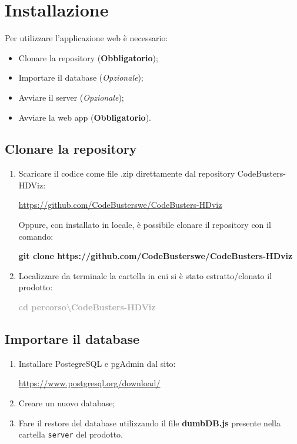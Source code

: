 \section{Installazione}
Per utilizzare l'applicazione web è necessario:
\begin{itemize}
\item Clonare la repository (\textbf{Obbligatorio});
\item Importare il database (\textit{Opzionale});
\item Avviare il server (\textit{Opzionale});
\item Avviare la web app (\textbf{Obbligatorio}).
\end{itemize}
\subsection{Clonare la repository}
\begin{enumerate}[label=\textbf{\arabic*})]
	\item Scaricare il codice come file .zip direttamente dal repository CodeBusters-HDViz:
		\begin{center}
			\textcolor{blue}{\url{https://github.com/CodeBusterswe/CodeBusters-HDviz}}
		\end{center}	
	Oppure, con  installato in locale, è possibile clonare il repository con il comando:
		\begin{center}
			\textcolor{coloreRosso}{\textbf{git clone https://github.com/CodeBusterswe/CodeBusters-HDviz}}
		\end{center}
      
	\item Localizzare da terminale la cartella in cui si è stato estratto/clonato il prodotto:  
		\begin{center}
			\textcolor{darkgray}{\textbf{cd percorso\textbackslash CodeBusters-HDViz}}
 		\end{center}
\end{enumerate}
\subsection{Importare il database}
\begin{enumerate}[label=\textbf{\arabic*})]
\item Installare PostegreSQL e pgAdmin dal sito:
	\begin{center}
			\textcolor{blue}{\url{https://www.postgresql.org/download/}}
	\end{center}	
\item Creare un nuovo database;
\item Fare il restore del database utilizzando il file \textbf{dumbDB.js} presente nella cartella \texttt{server} del prodotto.
\end{enumerate}
